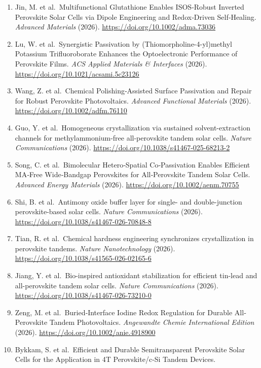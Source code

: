\documentclass[
  11pt,
]{article}
\begin{document}
\begin{enumerate}
  \url{https://doi.org/10.1126/sciadv.aef6596}
\item
  Jin, M. et al.~Multifunctional Glutathione Enables ISOS‐Robust
  Inverted Perovskite Solar Cells via Dipole Engineering and
  Redox‐Driven Self‐Healing. \emph{Advanced Materials} (2026).
  \url{https://doi.org/10.1002/adma.73036}
\item
  Lu, W. et al.~Synergistic Passivation by (Thiomorpholine-4-yl)methyl
  Potassium Trifluoroborate Enhances the Optoelectronic Performance of
  Perovskite Films. \emph{ACS Applied Materials \& Interfaces} (2026).
  \url{https://doi.org/10.1021/acsami.5c23126}
\item
  Wang, Z. et al.~Chemical Polishing‐Assisted Surface Passivation and
  Repair for Robust Perovskite Photovoltaics. \emph{Advanced Functional
  Materials} (2026). \url{https://doi.org/10.1002/adfm.76110}
\item
  Guo, Y. et al.~Homogeneous crystallization via sustained
  solvent-extraction channels for methylammonium-free all-perovskite
  tandem solar cells. \emph{Nature Communications} (2026).
  \url{https://doi.org/10.1038/s41467-025-68213-2}
\item
  Song, C. et al.~Bimolecular Hetero‐Spatial Co‐Passivation Enables
  Efficient MA‐Free Wide‐Bandgap Perovskites for All‐Perovskite Tandem
  Solar Cells. \emph{Advanced Energy Materials} (2026).
  \url{https://doi.org/10.1002/aenm.70755}
\item
  Shi, B. et al.~Antimony oxide buffer layer for single- and
  double-junction perovskite-based solar cells. \emph{Nature
  Communications} (2026).
  \url{https://doi.org/10.1038/s41467-026-70848-8}
\item
  Tian, R. et al.~Chemical hardness engineering synchronizes
  crystallization in perovskite tandems. \emph{Nature Nanotechnology}
  (2026). \url{https://doi.org/10.1038/s41565-026-02165-6}
\item
  Jiang, Y. et al.~Bio-inspired antioxidant stabilization for efficient
  tin-lead and all-perovskite tandem solar cells. \emph{Nature
  Communications} (2026).
  \url{https://doi.org/10.1038/s41467-026-73210-0}
\item
  Zeng, M. et al.~Buried‐Interface Iodine Redox Regulation for Durable
  All‐Perovskite Tandem Photovoltaics. \emph{Angewandte Chemie
  International Edition} (2026).
  \url{https://doi.org/10.1002/anie.4918900}
\item
  Bykkam, S. et al.~Efficient and Durable Semitransparent Perovskite
  Solar Cells for the Application in 4T Perovskite/c‐Si Tandem Devices.

\end{enumerate}
\end{document}
